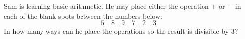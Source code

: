 Sam is learning basic arithmetic. He may place either the operation $+$ or $-$ in each of the blank spots between the numbers below: $$5\,\, \_ \,\, 8\,\, \_ \,\,9\,\, \_ \,\,7\,\,\_ \,\,2\,\,\_ \,\,3$$In how many ways can he place the operations so the result is divisible by $3$?
